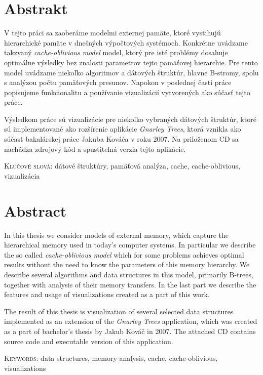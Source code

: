\chapter*{Abstrakt}

V tejto práci sa zaoberáme modelmi externej pamäte, ktoré vystihujú hierarchické pamäte v dnešných výpočtových systémoch. Konkrétne uvádzame takzvaný \emph{cache-oblivious model} model, ktorý pre isté problémy dosahuje optimálne výsledky bez znalosti parametrov tejto pamäťovej hierarchie. Pre tento model uvádzame niekoľko algoritmov a dátových štruktúr, hlavne B-stromy, spolu s analýzou počtu pamäťových presunov. Napokon v poslednej časti práce popisujeme funkcionalitu a používanie vizualizácií vytvorených ako súčasť tejto práce.

Výsledkom práce sú vizualizácie pre niekoľko vybraných \obliv dátových štruktúr, ktoré sú implementované ako rozšírenie aplikácie \emph{Gnarley Trees}, ktorá vznikla ako súčasť bakalárskej práce Jakuba Kováča v roku 2007. Na priloženom CD sa nachádza zdrojový kód a spustiteľná verzia tejto aplikácie.


\vspace{2cm}
\noindent\textsc{Kľúčové slová:} dátové štruktúry, pamäťová analýza, cache, cache-oblivious, vizualizácia

\newpage
\chapter*{Abstract}
In this thesis we consider models of external memory, which capture the hierarchical memory used in today's computer systems. In particular we describe the so called \emph{cache-oblivious model} which for some problems achieves optimal results without the need to know the parameters of this memory hierarchy. We describe several algorithms and data structures in this model, primarily B-trees, together with analysis of their memory transfers. In the last part we describe the features and usage of visualizations created as a part of this work.

The result of this thesis is visualization of several selected \obliv data structures implemented as an extension of the \emph{Gnarley Trees} application, which was created as a part of bachelor's thesis by Jakub Kováč in 2007. The attached CD contains source code and executable version of this application. 

\vspace{2cm}
\noindent\textsc{Keywords:} data structures, memory analysis, cache, cache-oblivious, visualizations